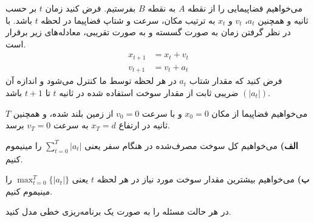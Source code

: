 می‌خواهیم فضاپیمایی را از نقطه
$A$
به نقطه
$B$
بفرستیم. فرض کنید زمان
$t$
بر حسب ثانیه و همچنین
$a_t$،
$v_t$
و
$x_t$
به ترتیب مکان، سرعت و شتاپ فضاپیما در لحظه
$t$
باشد. با در نظر گرفتن زمان به صورت گسسته و به صورت تقریبی، معادله‌های زیر برقرار است.
\begin{align*}
    x_{t + 1} &= x_t + v_t \\
    v_{t + 1} &= v_t + a_t
\end{align*}
فرض کنید که مقدار شتاب
$a_t$
در هر لحظه توسط ما کنترل می‌شود و اندازه آن
$(|a_t|)$
ضریبی ثابت از مقدار سوخت استفاده شده در ثانیه
$t$
تا 
$t + 1$
باشد.

می‌خواهیم فضاپیما از مکان
$x_0 = 0$
و با سرعت
$v_0 = 0$
از زمین بلند شده، و همچنین
$T$
ثانیه در ارتفاع
$x_T = d$
به سرعت 
$v_T = 0$
برسد.
\vspace*{10pt}

\textbf{الف)}
می‌خواهیم کل سوخت مصرف‌شده در هنگام سفر یعنی
$\sum_{t=0}^{T} |a_t|$
را مینیموم کنیم.

\vspace*{5pt}
\textbf{ب)}
می‌خواهیم بیشترین مقدار سوخت مورد نیاز در هر لحظه
$t$
یعنی
$\max_{t=0}^{T} \{|a_t|\}$
را مینیموم کنیم.

\vspace*{5pt}
در هر حالت مسئله را به صورت یک برنامه‌ریزی خطی مدل کنید.
